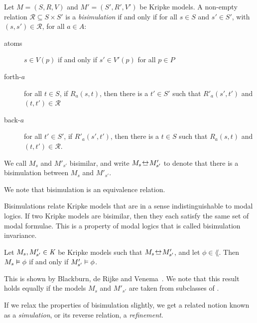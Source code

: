 \begin{definition}[Bisimulation]
Let $M = (S, R, V)$ and $M' = (S', R', V')$ be Kripke models. A non-empty
relation $\mathcal{R} \subseteq S \times S'$ is a \textit{bisimulation} if and
only if for all $s \in S$ and $s' \in S'$, with $(s, s') \in \mathcal{R}$, for
all $a \in A$:

\begin{description}
\item[atoms] $s \in V(p)$ if and only if $s' \in V'(p)$ for all
$p \in P$

\item[forth-$a$] for all $t \in S$, if $R_a(s, t)$, then there is a
$t' \in S'$ such that $R'_a(s', t')$ and $(t,
t') \in \mathcal{R}$

\item[back-$a$] for all $t' \in S'$, if $R'_a(s',
t')$, then there is a $t \in S$ such that $R_a(s, t)$ and $(t, t')
\in \mathcal{R}$.
\end{description}

We call $M_s$ and $M'_{s'}$ bisimilar, and write $M_s \bisim M'_{s'}$ to denote
that there is a bisimulation between $M_s$ and $M'_{s'}$.
\end{definition}

We note that bisimulation is an equivalence relation.

Bisimulations relate Kripke models that are in a sense indistinguishable to
modal logics. If two Kripke models are bisimilar, then they each satisfy the
same set of modal formulae. This is a property of modal logics that is called
bisimulation invariance.

\begin{lemma}
Let $M_s, M'_{s'} \in \textit{K}$ be Kripke models such that $M_s \bisim M'_{s'}$,
and let $\phi \in \lang$. Then $M_s \vDash \phi$ if and only if $M'_{s'}
\vDash \phi$.
\end{lemma}

This is shown by Blackburn, de Rijke and Venema~\cite{blackburn2002modal}. We
note that this result holds equally if the models $M_s$ and $M'_{s'}$ are taken
from subclasses of \classK{}.

If we relax the properties of bisimulation slightly, we get a related notion
known as a {\em simulation}, or its reverse relation, a {\em refinement}.

